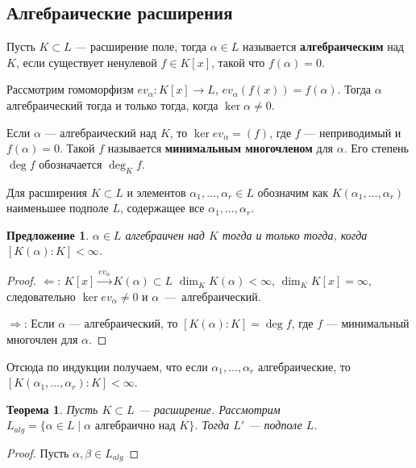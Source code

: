 \documentclass[a4paper]{article}
\newtheorem{theorem}{Теорема}
\numberwithin{theorem}{section}
\numberwithin{lemma}{section}
\newtheorem{proposition}{Предложение}
\numberwithin{proposition}{section}
\numberwithin{corollary}{section}
\begin{document}
\subsection*{Алгебраические расширения}
Пусть $K \subset L$ --- расширение поле, тогда $\alpha \in L$
называется \textbf{алгебраическим} над $K$, если существует ненулевой
$f \in K[x]$, такой что $f(\alpha) = 0$.

Рассмотрим гомоморфизм $ev_\alpha: K[x] \to L$, $ev_\alpha(f(x)) = f(\alpha)$. Тогда $\alpha$ алгебраический тогда и только тогда,
когда $\ker \alpha \ne 0$.

Если $\alpha$ --- алгебраический над $K$, то $\ker ev_\alpha = (f)$,
где $f$ --- неприводимый и $f(\alpha) = 0$. Такой $f$ называется
\textbf{минимальным многочленом} для $\alpha$. Его степень $\deg f$ обозначается $\deg_K f$.

Для расширения $K \subset L$ и
элементов $\alpha_1, \dots, \alpha_r \in L$
обозначим как $K(\alpha_1, \dots, \alpha_r)$ наименьшее подполе $L$,
содержащее все $\alpha_1, \dots, \alpha_r$.

\begin{proposition}
$\alpha \in L$ алгебраичен над $K$ тогда и только тогда,
когда $[K(\alpha) : K] < \infty$.
\end{proposition}
\begin{proof}

$\Leftarrow$: $K[x] \xrightarrow{ev_\alpha} K(\alpha) \subset L$
$\dim_K K(\alpha) < \infty$, $\dim_K K[x] = \infty$, следовательно
$\ker ev_\alpha \ne 0$ и $\alpha$~---~алгебраический.

$\Rightarrow$: Если $\alpha$ --- алгебраический, то $[K(\alpha) : K] = \deg f$, где $f$ --- минимальный многочлен для $\alpha$.
\end{proof}

Отсюда по индукции получаем, что если $\alpha_1, \dots, \alpha_r$ алгебраические, то $[K(\alpha_1, \dots, \alpha_r) : K] < \infty$.

\begin{theorem}
Пусть $K \subset L$ --- расширение.
Рассмотрим $L_{alg} = \{\alpha \in L \mid  \text{$\alpha$ алгебраично над $K$}\}$.
Тогда $L'$ --- подполе $L$.
\end{theorem}
\begin{proof}
Пусть $\alpha, \beta \in L_{alg}$
\end{proof}
\end{document}
